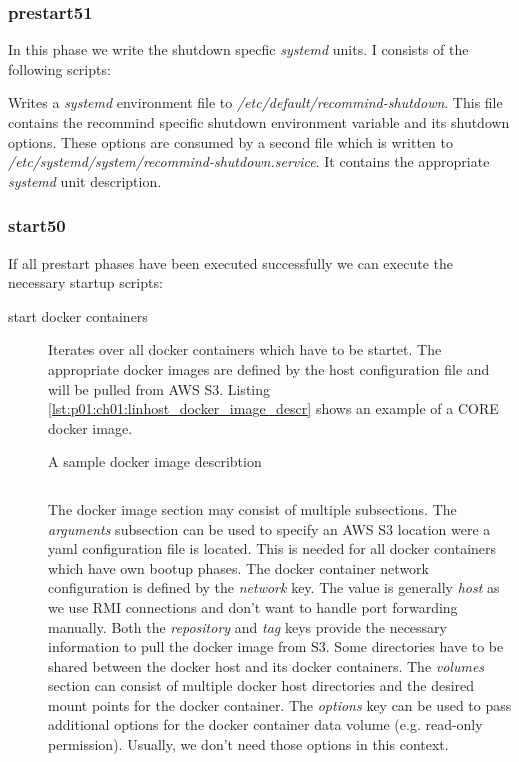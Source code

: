 			\subsubsection{prestart51}
			In this phase we write the shutdown specfic \emph{systemd} units. I consists of the following scripts:
			\begin{description}
				\sloppy
				\item[systemd unit description installation] Writes a \emph{systemd} environment file to \emph{/etc/default/recommind-shutdown}. This file contains the recommind specific shutdown environment variable and its shutdown options. These options are consumed by a second file which is written to \emph{/etc/systemd/system/recommind-shutdown.service}. It contains the appropriate \emph{systemd} unit description.
			\end{description}
			\subsubsection{start50}
			If all prestart phases have been executed successfully we can execute the necessary startup scripts:
			\begin{description}
				\item[start docker containers] Iterates over all docker containers which have to be startet. The appropriate docker images are defined by the host configuration file and will be pulled from AWS S3. Listing \ref{lst:p01:ch01:linhost_docker_image_descr} shows an example of a CORE docker image.
				\begin{listing}[H]
					\caption{A sample docker image describtion}
					\label{lst:p01:ch01:linhost_docker_image_descr}
					\inputminted{yaml}{\relative{chapter_01/section_3.2/docker_image_description_example.yaml}}
				\end{listing}
				The docker image section may consist of multiple subsections. The \emph{arguments} subsection can be used to specify an AWS S3 location were a yaml configuration file is located. This is needed for all docker containers which have own bootup phases. The docker container network configuration is defined by the \emph{network} key. The value is generally \emph{host} as we use RMI connections and don't want to handle port forwarding manually. Both the \emph{repository} and \emph{tag} keys provide the necessary information to pull the docker image from S3. Some directories have to be shared between the docker host and its docker containers. The \emph{volumes} section can consist of multiple docker host directories and the desired mount points for the docker container. The \emph{options} key can be used to pass additional options for the docker container data volume (e.g. read-only permission). Usually, we don't need those options in this context.
			\end{description}
